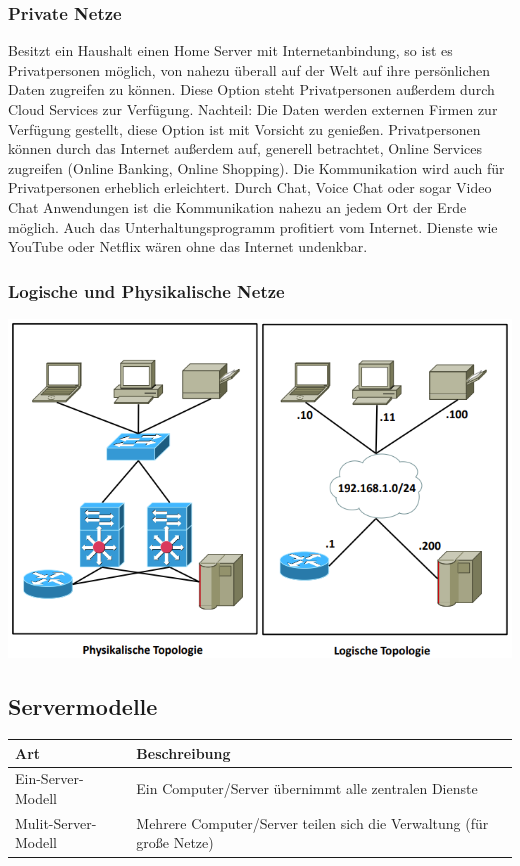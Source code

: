 \documentclass[12pt,a4paper]{article}
\begin{document}
		\subsubsection{Private Netze}
			Besitzt ein Haushalt einen Home Server mit Internetanbindung, so ist es Privatpersonen möglich, von nahezu überall auf der Welt auf ihre persönlichen Daten zugreifen zu können. Diese Option steht Privatpersonen außerdem durch Cloud Services zur Verfügung. Nachteil: Die Daten werden externen Firmen zur Verfügung gestellt, diese Option ist mit Vorsicht zu genießen. Privatpersonen können durch das Internet außerdem auf, generell betrachtet, Online Services zugreifen (Online Banking, Online Shopping). Die Kommunikation wird auch für Privatpersonen erheblich erleichtert. Durch Chat, Voice Chat oder sogar Video Chat Anwendungen ist die Kommunikation nahezu an jedem Ort der Erde möglich. Auch das Unterhaltungsprogramm profitiert vom Internet. Dienste wie YouTube oder Netflix wären ohne das Internet undenkbar.

		\subsubsection{Logische und Physikalische Netze}
			\includegraphics[width=\textwidth]{Bilder/Logische-und-physikalische-netze.png}
		
		\subsection{Servermodelle}
		\begin{table}[h]
			\renewcommand{\arraystretch}{1.5}	
			\centering
				\begin{tabularx}{17cm}{|X|X|}
					\hline
					\cellcolor{cyan!60!white}Art&\cellcolor{cyan!60!white}Beschreibung\\
					\hline
					Ein-Server-Modell&Ein Computer/Server übernimmt alle zentralen Dienste \\
					\hline
					Mulit-Server-Modell&Mehrere Computer/Server teilen sich die Verwaltung (für große Netze) \\
					\hline
				\end{tabularx}
		\end{table}
		
\end{document}
